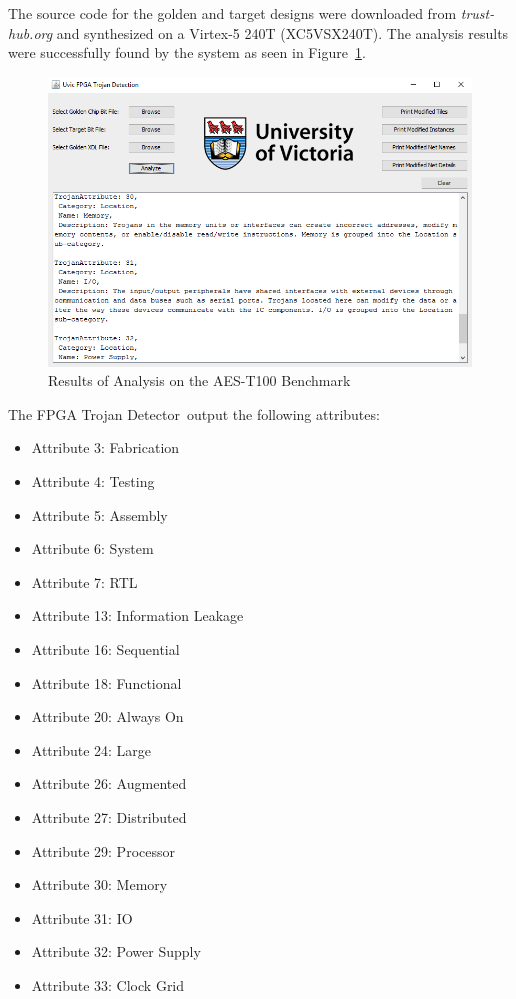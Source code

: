 \documentclass[conference]{IEEEtran}
\newcommand{\Name}{\acrshort{FPGA} Trojan Detector}
\newcommand{\NameNoPeriod}{\Name~}
\begin{document}
The source code for the \gls{golden} and \gls{target} designs were downloaded from \textit{trust-hub.org} and synthesized on a Virtex-5 240T  (XC5VSX240T).
The analysis results were successfully found by the system as seen in Figure~\ref{fig:aesResult}.
\begin{figure}[h]
	\centering
	\includegraphics[width=1\linewidth]{Figures/aesResult}
	\caption[Results of Analysis on the AES-T100 Benchmark]{Results of Analysis on the AES-T100 Benchmark}
	\label{fig:aesResult}
\end{figure}

The \NameNoPeriod output the following attributes:
\begin{itemize}
	\item Attribute 3: Fabrication
	\item Attribute 4: Testing
	\item Attribute 5: Assembly
	\item Attribute 6: System
	\item Attribute 7: RTL
	\item Attribute 13: Information Leakage
	\item Attribute 16: Sequential
	\item Attribute 18: Functional
	\item Attribute 20: Always On
	\item Attribute 24: Large
	\item Attribute 26: Augmented
	\item Attribute 27: Distributed
	\item Attribute 29: Processor
	\item Attribute 30: Memory
	\item Attribute 31: \acrshort{IO}
	\item Attribute 32: Power Supply
	\item Attribute 33: Clock Grid
\end{itemize}
\end{document}
